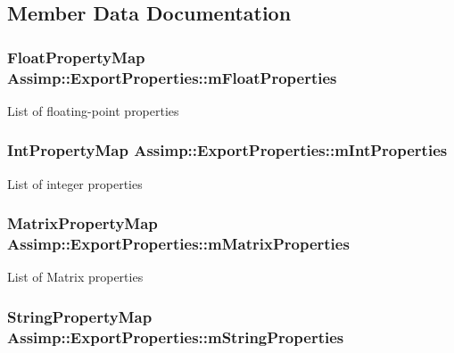\subsection{Member Data Documentation}
\hypertarget{class_assimp_1_1_export_properties_acf10a6aec3a1d5cb6f190bebc48ed4c7}{
\subsubsection[{m\-Float\-Properties}]{\setlength{\rightskip}{0pt plus 5cm}Float\-Property\-Map Assimp\-::\-Export\-Properties\-::m\-Float\-Properties\hspace{0.3cm}{\ttfamily [protected]}}}\label{class_assimp_1_1_export_properties_acf10a6aec3a1d5cb6f190bebc48ed4c7}
List of floating-\/point properties \hypertarget{class_assimp_1_1_export_properties_ad69c0546b1e7faf054240f228cf5f9b6}{
\subsubsection[{m\-Int\-Properties}]{\setlength{\rightskip}{0pt plus 5cm}Int\-Property\-Map Assimp\-::\-Export\-Properties\-::m\-Int\-Properties\hspace{0.3cm}{\ttfamily [protected]}}}\label{class_assimp_1_1_export_properties_ad69c0546b1e7faf054240f228cf5f9b6}
List of integer properties \hypertarget{class_assimp_1_1_export_properties_a1c7dc9cd6b7f34a98fdb1a16f37b260f}{
\subsubsection[{m\-Matrix\-Properties}]{\setlength{\rightskip}{0pt plus 5cm}Matrix\-Property\-Map Assimp\-::\-Export\-Properties\-::m\-Matrix\-Properties\hspace{0.3cm}{\ttfamily [protected]}}}\label{class_assimp_1_1_export_properties_a1c7dc9cd6b7f34a98fdb1a16f37b260f}
List of Matrix properties \hypertarget{class_assimp_1_1_export_properties_aa842acefe6a2b4eb8efff24030850a4f}{
\subsubsection[{m\-String\-Properties}]{\setlength{\rightskip}{0pt plus 5cm}String\-Property\-Map Assimp\-::\-Export\-Properties\-::m\-String\-Properties\hspace{0.3cm}{\ttfamily [protected]}}}\label{class_assimp_1_1_export_properties_aa842acefe6a2b4eb8efff24030850a4f}
